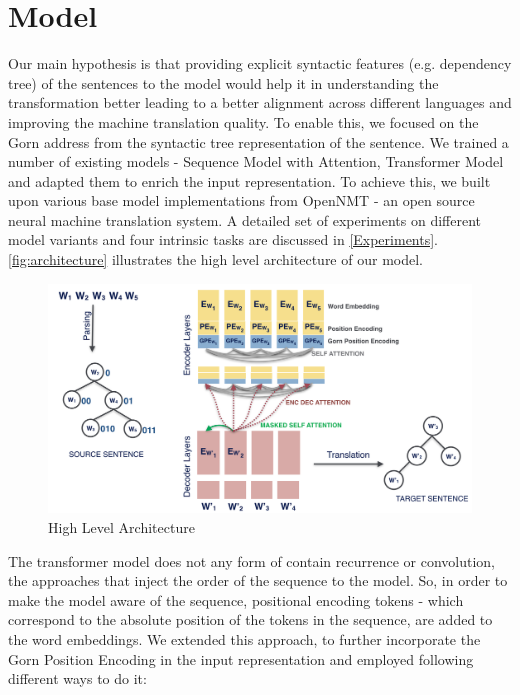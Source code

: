 \documentclass{article}
\begin{document}
\section{Model}
Our main hypothesis is that providing explicit syntactic features (e.g. dependency tree) of the sentences to the model
would help it in understanding the transformation better leading to a better alignment across different languages and improving the machine translation quality. To enable this, we focused on the Gorn address from the syntactic tree representation of the sentence. We trained a number of existing models - Sequence Model with Attention, Transformer Model \citep{Vaswani2017AttentionIA} and adapted them to enrich the input representation. To achieve this, we built upon various base model implementations from OpenNMT \citep{klein-etal-2017-opennmt} - an open source neural machine translation system. A detailed set of experiments on different model variants and four intrinsic tasks are discussed in \autoref{Experiments}. \autoref{fig:architecture} illustrates the high level architecture of our model.
\begin{figure}[H]
    \centering
\includegraphics[width=13cm]{pictures/Architecture.png}
    \caption{High Level Architecture}
    \label{fig:architecture}
\end{figure}

The transformer model does not any form of contain recurrence or convolution, the approaches that inject the order of the sequence to the model. So, in order to make the model aware of the sequence, positional encoding tokens - which correspond to the absolute position of the tokens in the sequence, are added to the word embeddings. We extended this approach, to further incorporate the Gorn Position Encoding in the input representation and employed following different ways to do it:
\end{document}
